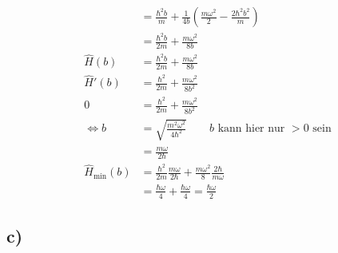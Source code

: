 \begin{align*}
        &= \frac{\hbar^2 b}{m} + \frac{1}{4b} \left( \frac{m\omega^2}{2} - \frac{2\hbar^2 b^2}{m} \right)\\
        &= \frac{\hbar^2 b}{2m} + \frac{m\omega^2}{8b}\\
        \hat{H}(b) &= \frac{\hbar^2 b}{2m} + \frac{m\omega^2}{8b}\\
        \hat{H}'(b) &= \frac{\hbar^2}{2m} + \frac{m\omega^2}{8b^2}\\
        0 &= \frac{\hbar^2}{2m} + \frac{m\omega^2}{8b^2}\\
        \Leftrightarrow b &= \sqrt{ \frac{m^2 \omega^2}{4\hbar^2}} \qquad \text{$b$ kann hier nur $>0$ sein}\\
        &= \frac{m \omega}{2\hbar}\\
        \hat{H}_{\text{min}}(b) &= \frac{\hbar^2}{2m} \frac{m\omega}{2\hbar} + \frac{m\omega^2}{8} \frac{2\hbar}{m\omega}\\
        &= \frac{\hbar \omega}{4} + \frac{\hbar \omega}{4} = \frac{\hbar \omega}{2}
    \end{align*}

\subsection{c)}

